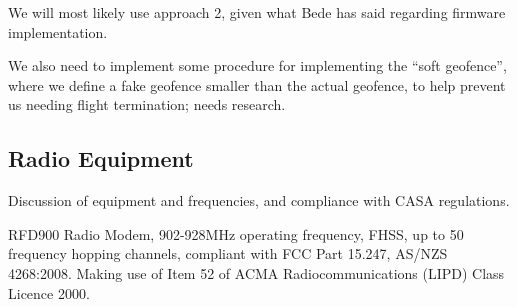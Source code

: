 We will most likely use approach 2, given what Bede has said regarding firmware implementation.

We also need to implement some procedure for implementing the ``soft geofence'', where we define a fake geofence smaller than the actual geofence, to help prevent us needing flight termination; needs research.

\subsection{Radio Equipment}
Discussion of equipment and frequencies, and compliance with CASA regulations.

RFD900 Radio Modem, 902-928MHz operating frequency, FHSS, up to 50 frequency hopping channels, compliant with FCC Part 15.247, AS/NZS 4268:2008. Making use of Item 52 of ACMA Radiocommunications (LIPD) Class Licence 2000.